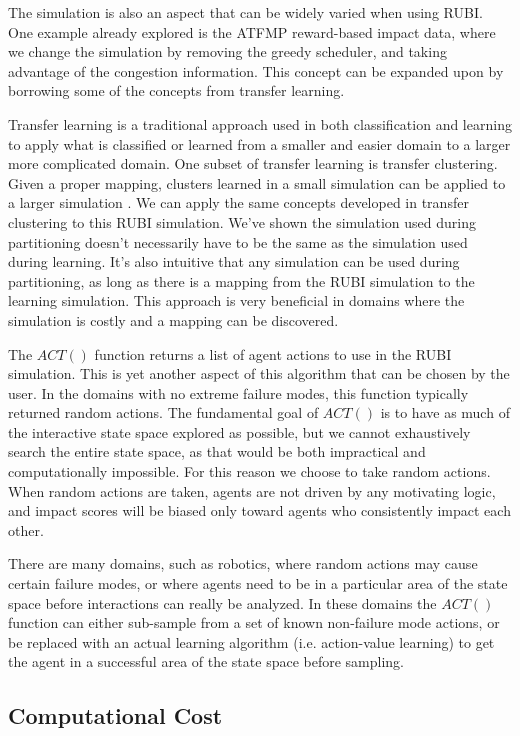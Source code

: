 \documentclass[onehalf,11pt]{beavtex}
\begin{document}
The simulation is also an aspect that can be widely varied when using RUBI. One example already explored is the ATFMP reward-based impact data, where we change the simulation by removing the greedy scheduler, and taking advantage of the congestion information. This concept can be expanded upon by borrowing some of the concepts from transfer learning.

Transfer learning is a traditional approach used in both classification and learning to apply what is classified or learned from a smaller and easier domain to a larger more complicated domain. One subset of transfer learning is transfer clustering. Given a proper mapping, clusters learned in a small simulation can be applied to a larger simulation \cite{6378284}. We can apply the same concepts developed in transfer clustering to this RUBI simulation. We've shown the simulation used during partitioning doesn't necessarily have to be the same as the simulation used during learning. It's also intuitive that any simulation can be used during partitioning, as long as there is a mapping from the RUBI simulation to the learning simulation. This approach is very beneficial in domains where the simulation is costly and a mapping can be discovered. 

The $ACT()$ function returns a list of agent actions to use in the RUBI simulation. This is yet another aspect of this algorithm that can be chosen by the user. In the domains with no extreme failure modes, this function typically returned random actions. The fundamental goal of $ACT()$ is to have as much of the interactive state space explored as possible, but we cannot exhaustively search the entire state space, as that would be both impractical and computationally impossible. For this reason we choose to take random actions. When random actions are taken, agents are not driven by any motivating logic, and impact scores will be biased only toward agents who consistently impact each other. 

There are many domains, such as robotics, where random actions may cause certain failure modes, or where agents need to be in a particular area of the state space before interactions can really be analyzed. In these domains the $ACT()$ function can either sub-sample from a set of known non-failure mode actions, or be replaced with an actual learning algorithm (i.e. action-value learning) to get the agent in a successful area of the state space before sampling. 

\subsection{Computational Cost}
\end{document}
